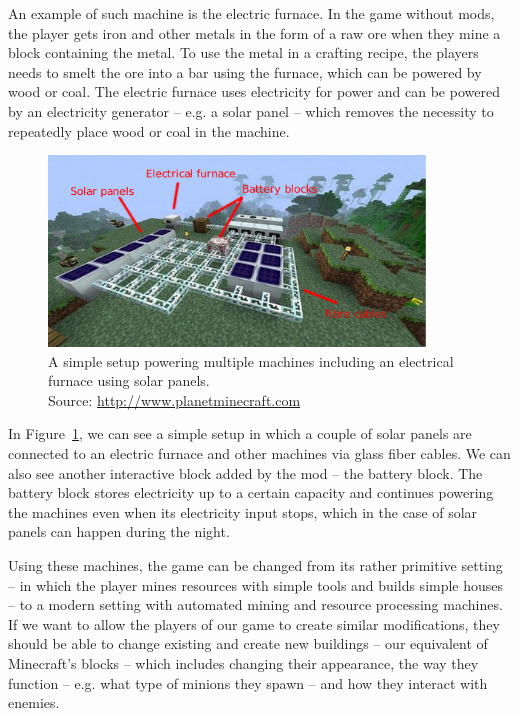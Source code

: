 An example of such machine is the electric furnace. In the game without mods, the player gets iron and other metals in the form
of a raw ore when they mine a block containing the metal. To use the metal in a crafting recipe, the players needs to smelt the ore
into a bar using the furnace, which can be powered by wood or coal. The electric furnace uses electricity for power and can be
powered by an electricity generator -- e.g. a solar panel -- which removes the necessity to repeatedly place wood or coal in
the machine.

\begin{figure}[H]
    \centering
    \includegraphics[width=10cm]{../img/ic-solar.pdf}
    \caption{A simple setup powering multiple machines including an electrical furnace using solar panels.
             \\Source: \href{http://static.planetminecraft.com/files/resource\_media/screenshot/1246/javaw-2012-11-12-20-51-09-46\_4122139.jpg}{http://www.planetminecraft.com}}
    \label{ic-solar}
\end{figure}

In Figure~\ref{ic-solar}, we can see a simple setup in which a couple of solar panels are connected to an electric furnace and other
machines via glass fiber cables. We can also see another interactive block added by the mod -- the battery block. The battery block
stores electricity up to a certain capacity and continues powering the machines even when its electricity input stops, which in the
case of solar panels can happen during the night.

Using these machines, the game can be changed from its rather primitive setting -- in which the player mines resources with simple
tools and builds simple houses -- to a modern setting with automated mining and resource processing machines. If we want to allow
the players of our game to create similar modifications, they should be able to change existing and create new buildings -- our equivalent of 
Minecraft's blocks -- which includes changing their appearance, the way they function -- e.g. what type of minions they spawn -- and
how they interact with enemies.

